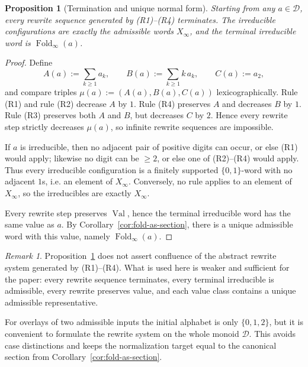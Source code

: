 \documentclass[11pt,letterpaper]{article}
\numberwithin{equation}{section}
\theoremstyle{plain}
\newtheorem{proposition}[theorem]{Proposition}
\theoremstyle{definition}
\theoremstyle{remark}
\newtheorem{remark}[theorem]{Remark}
\newcommand{\D}{\mathcal{D}}
\newcommand{\Xinf}{X_\infty}
\DeclareMathOperator{\Val}{Val}
\DeclareMathOperator{\Fold}{Fold}
\begin{document}
\begin{proposition}[Termination and unique normal form]\label{prop:rewrite-termination}
Starting from any $a\in\D$, every rewrite sequence generated by
\textup{(R1)}--\textup{(R4)} terminates.  The irreducible configurations are
exactly the admissible words $\Xinf$, and the terminal irreducible word is
$\Fold_\infty(a)$.
\end{proposition}

\begin{proof}
Define
\[
A(a):=\sum_{k\ge 1} a_k,\qquad
B(a):=\sum_{k\ge 1} k\,a_k,\qquad
C(a):=a_2,
\]
and compare triples $\mu(a):=(A(a),B(a),C(a))$ lexicographically.
Rule \textup{(R1)} and rule \textup{(R2)} decrease $A$ by $1$.
Rule \textup{(R4)} preserves $A$ and decreases $B$ by $1$.
Rule \textup{(R3)} preserves both $A$ and $B$, but decreases $C$ by $2$.
Hence every rewrite step strictly decreases $\mu(a)$, so infinite rewrite
sequences are impossible.

If $a$ is irreducible, then no adjacent pair of positive digits can occur, or
else \textup{(R1)} would apply; likewise no digit can be $\ge 2$, or else one of
\textup{(R2)}--\textup{(R4)} would apply.  Thus every irreducible configuration is a
finitely supported $\{0,1\}$-word with no adjacent $1$s, i.e. an element of
$\Xinf$.  Conversely, no rule applies to an element of $\Xinf$, so the
irreducibles are exactly $\Xinf$.

Every rewrite step preserves $\Val$, hence the terminal irreducible word has
the same value as $a$.  By Corollary~\ref{cor:fold-as-section}, there is a
unique admissible word with this value, namely $\Fold_\infty(a)$.
\end{proof}

\begin{remark}
Proposition~\ref{prop:rewrite-termination} does not assert confluence of the
abstract rewrite system generated by \textup{(R1)}--\textup{(R4)}.  What is
used here is weaker and sufficient for the paper: every rewrite sequence
terminates, every terminal irreducible is admissible, every rewrite preserves
value, and each value class contains a unique admissible representative.
\end{remark}

For overlays of two admissible inputs the initial alphabet is only
$\{0,1,2\}$, but it is convenient to formulate the rewrite system on the whole
monoid $\D$.  This avoids case distinctions and keeps the normalization target
equal to the canonical section from Corollary~\ref{cor:fold-as-section}.
\end{document}

